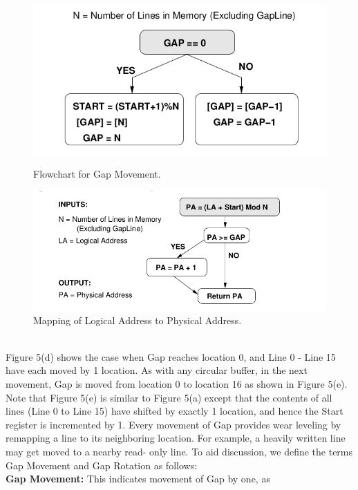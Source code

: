 \documentclass[11pt, conference, onecolumn]{IEEEtran}
\begin{document}
\begin{figure}[!tbp]
  \centering
  \begin{minipage}[b]{0.4\textwidth}
    \includegraphics[width=\textwidth]{flow1.png}
    \caption{Flowchart for Gap Movement.}
  \end{minipage}
  \hfill
  \begin{minipage}[b]{0.4\textwidth}
    \includegraphics[width=\textwidth]{flow2.png}
    \caption{Mapping of Logical Address to Physical Address.}
  \end{minipage}
\end{figure}
~\\Figure 5(d) shows the case when Gap reaches location 0, and
Line 0 - Line 15 have each moved by 1 location. As with any
circular buffer, in the next movement, Gap is moved from location
0 to location 16 as shown in Figure 5(e). Note that Figure 5(e) is
similar to Figure 5(a) except that the contents of all lines (Line 0
to Line 15) have shifted by exactly 1 location, and hence the Start
register is incremented by 1. Every movement of Gap provides
wear leveling by remapping a line to its neighboring location. For
example, a heavily written line may get moved to a nearby read-
only line. To aid discussion, we define the terms Gap Movement
and Gap Rotation as follows: 
\\\textbf{Gap Movement:} This indicates movement of Gap by one, as
\end{document}
